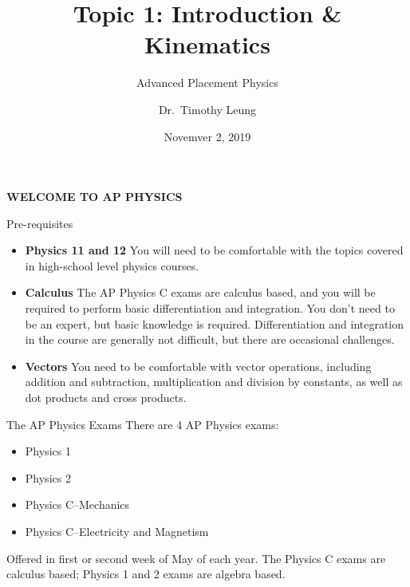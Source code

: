 \documentclass[12pt,compress,aspectratio=169]{beamer}
\title{Topic 1: Introduction \& Kinematics} %
\subtitle{Advanced Placement Physics}
\author[TML]{Dr.\ Timothy Leung}
\institute{Olympiads School}
\date{Novemver 2, 2019}
\begin{document}
\begin{frame}{}

  {\LARGE
    \begin{center}
      \textbf{WELCOME TO AP PHYSICS}
    \end{center}
  }
\end{frame}



\begin{frame}{Pre-requisites}
  \begin{itemize}
  \item\textbf{Physics 11 and 12} %
    You will need to be comfortable with the topics covered in high-school
    level physics courses.
  \item\textbf{Calculus} The AP Physics C exams are calculus based, and you
    will be required to perform basic differentiation and integration. You
    don't need to be an expert, but basic knowledge is required.
    Differentiation and integration in the course are generally not
    difficult, but there are occasional challenges.
  \item\textbf{Vectors} You need to be comfortable with vector operations,
    including addition and subtraction, multiplication and division by
    constants, as well as dot products and cross products.
  \end{itemize}
\end{frame}



\begin{frame}{The AP Physics Exams}
  There are 4 AP Physics exams:
  \begin{itemize}
  \item Physics 1
  \item Physics 2
  \item Physics C--Mechanics
  \item Physics C--Electricity and Magnetism
  \end{itemize}
  Offered in first or second week of May of each year. The Physics C exams
  are calculus based; Physics 1 and 2 exams are algebra based.
\end{frame}



\end{document}
